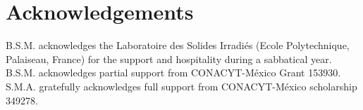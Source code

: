 \documentclass[prb,superscriptaddress,showpacs,twocolumn,letterpaper]{revtex4}
\begin{document}
\section{Acknowledgements}\label{sec:acknowledgements}

B.S.M. acknowledges the Laboratoire des Solides Irradi\'es (Ecole Polytechnique,
Palaiseau, France) for the support and hospitality during a sabbatical year.
B.S.M. acknowledges partial support from CONACYT-M\'exico Grant 153930. S.M.A.
gratefully acknowledges full support from CONACYT-M\'exico scholarship 349278.



\end{document}
